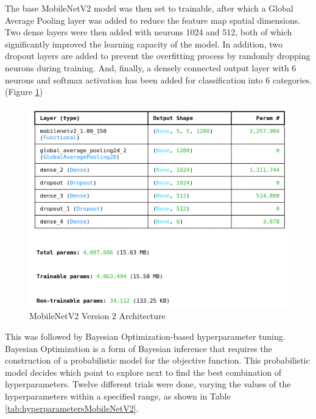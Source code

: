 \documentclass[conference]{IEEEtran}
\begin{document}
The base MobileNetV2 model was then set to trainable, after which a Global Average Pooling layer was added to reduce the feature map spatial dimensions. Two dense layers were then added with neurons 1024 and 512, both of which significantly improved the learning capacity of the model. In addition, two dropout layers are added to prevent the overfitting process by randomly dropping neurons during training. And, finally, a densely connected output layer with 6 neurons and softmax activation has been added for classification into 6 categories. (Figure \ref{fig:archMobileNetV2_2})

\begin{figure}[H]
    \centering
    \includegraphics[width=1\linewidth]{images/archMobileNetV2_2.png}
    \caption{MobileNetV2 Version 2 Architecture}
    \label{fig:archMobileNetV2_2}
\end{figure}

This was followed by Bayesian Optimization-based hyperparameter tuning. Bayesian Optimization is a form of Bayesian inference that requires the construction of a probabilistic model for the objective function. This probabilistic model decides which point to explore next to find the best combination of hyperparameters. Twelve different trials were done, varying the values of the hyperparameters within a specified range, as shown in Table \ref{tab:hyperparametersMobileNetV2}.
\end{document}
